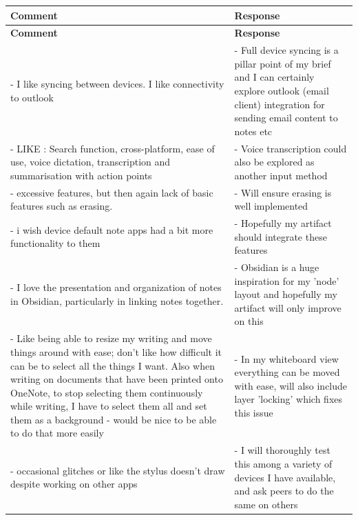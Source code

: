 \begin{longtable}{@{}p{}@{\hspace{1em}}p{}@{}}
\toprule
\textbf{Comment} & \textbf{Response} \\
\midrule
\endfirsthead

\toprule
\textbf{Comment} & \textbf{Response} \\
\midrule
\endhead

- I like syncing between devices. I like connectivity to outlook &
- Full device syncing is a pillar point of my brief and I can certainly explore outlook (email client) integration for sending email content to notes etc \\

- LIKE : Search function, cross-platform, ease of use, voice dictation, transcription and summarisation with action points
 & - Voice transcription could also be explored as another input method \\

- excessive features, but then again lack of basic features such as erasing. & 
- Will ensure erasing is well implemented \\

- i wish device default note apps had a bit more functionality to them & 
- Hopefully my artifact should integrate these features\\ 

- I love the presentation and organization of notes in Obsidian, particularly in linking notes together. & 
- Obsidian is a huge inspiration for my 'node' layout and hopefully my artifact will only improve on this \\ 

- Like being able to resize my writing and move things around with ease; don't like how difficult it can be to select all the things I want. Also when writing on documents that have been printed onto OneNote, to stop selecting them continuously while writing, I have to select them all and set them as a background - would be nice to be able to do that more easily & 
- In my whiteboard view everything can be moved with ease, will also include layer 'locking' which fixes this issue \\ 

- occasional glitches or like the stylus doesn't draw despite working on other apps & 
- I will thoroughly test this among a variety of devices I have available, and ask peers to do the same on others \\ 


\end{longtable}
